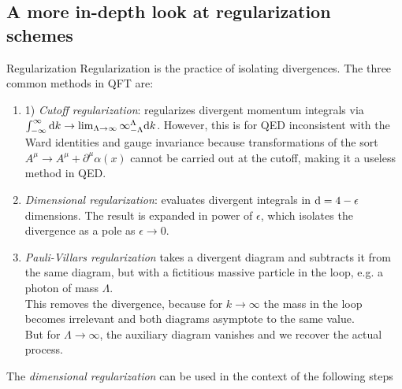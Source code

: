 \subsection{A more in-depth look at regularization schemes}
\begin{mybox}{Regularization}
	Regularization is the practice of isolating divergences. The three common methods in QFT are:
	\begin{enumerate}
		\item 1) \emph{Cutoff regularization}: regularizes divergent momentum integrals via $\int_{-\infty}^{\infty} \mathrm{d} k \rightarrow \lim_{\Lambda \rightarrow\infty} \infty_{-\Lambda}^{\Lambda} \mathrm{d} k$. However, this is for QED inconsistent with the Ward identities and gauge invariance because transformations of the sort $A^{\mu} \rightarrow A^{\mu} + \partial^{\mu} \alpha(x)$ cannot be carried out at the cutoff, making it a useless method in QED.
	\item \emph{Dimensional regularization}: evaluates divergent integrals in $\mathrm{d} =4-\epsilon$ dimensions. The result is expanded in power of $\epsilon$, which isolates the divergence as a pole as $\epsilon \rightarrow 0$.
	\item \emph{Pauli-Villars regularization} takes a divergent diagram and subtracts it from the same diagram, but with a fictitious massive particle in the loop, e.g. a photon of mass $\Lambda$.\\
	This removes the divergence, because for $k\rightarrow\infty$ the mass in the loop becomes irrelevant and both diagrams asymptote to the same value.\\
	But for $\Lambda \rightarrow \infty$, the auxiliary diagram vanishes and we recover the actual process.
	\end{enumerate}
\end{mybox}
The \emph{dimensional regularization} can be used in the context of the following steps
